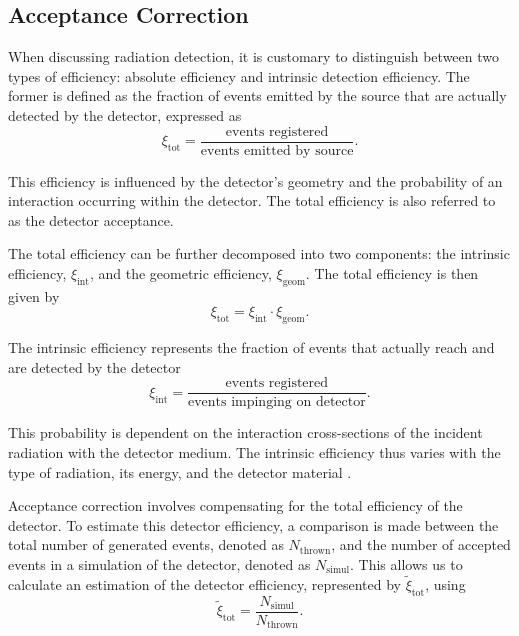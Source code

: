 \subsection{Acceptance Correction}
\label{13.40::acceptance_correction}
    When discussing radiation detection, it is customary to distinguish between two types of efficiency: absolute efficiency and intrinsic detection efficiency.
    The former is defined as the fraction of events emitted by the source that are actually detected by the detector, expressed as
    \begin{equation*}
        \xi_\text{tot} = \frac{\text{events registered}}{\text{events emitted by source}}.
    \end{equation*}

    This efficiency is influenced by the detector's geometry and the probability of an interaction occurring within the detector.
    The total efficiency is also referred to as the detector acceptance.

    The total efficiency can be further decomposed into two components: the intrinsic efficiency, $\xi_{\text{int}}$, and the geometric efficiency, $\xi_{\text{geom}}$.
    The total efficiency is then given by
    \begin{equation*}
        \xi_\text{tot} = \xi_\text{int} \cdot \xi_\text{geom}.
    \end{equation*}

    The intrinsic efficiency represents the fraction of events that actually reach and are detected by the detector
    \begin{equation*}
        \xi_\text{int} = \frac{\text{events registered}}{\text{events impinging on detector}}.
    \end{equation*}

    This probability is dependent on the interaction cross-sections of the incident radiation with the detector medium.
    The intrinsic efficiency thus varies with the type of radiation, its energy, and the detector material \cite{leo1987}.

    Acceptance correction involves compensating for the total efficiency of the detector.
    To estimate this detector efficiency, a comparison is made between the total number of generated events, denoted as $N_\text{thrown}$, and the number of accepted events in a simulation of the detector, denoted as $N_\text{simul}$.
    This allows us to calculate an estimation of the detector efficiency, represented by $\tilde\xi_\text{tot}$, using
    \begin{equation*}
        \tilde\xi_\text{tot} = \frac{N_\text{simul}}{N_\text{thrown}}.
    \end{equation*}

